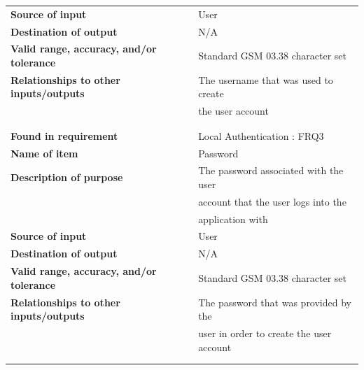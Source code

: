 \begin{tabular}{ll}
\textbf{Source of input}&User\\
\textbf{Destination of output}&N/A\\
\textbf{Valid range, accuracy, and/or tolerance}&Standard GSM 03.38 character set\\
\textbf{Relationships to other inputs/outputs}&The username that was used to create\\& the user account\\
&\\
&\\
\textbf{Found in requirement}&Local Authentication : FRQ3\\
\textbf{Name of item}&Password\\
\textbf{Description of purpose}&The password associated with the user \\&account that the user logs into the \\&application with\\
\textbf{Source of input}&User\\
\textbf{Destination of output}&N/A\\
\textbf{Valid range, accuracy, and/or tolerance}&Standard GSM 03.38 character set\\
\textbf{Relationships to other inputs/outputs}&The password that was provided by the\\& user in order to create the user account\\
&\\
&\\
\end{tabular}
\newpage

